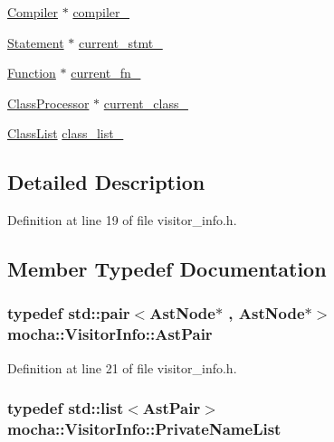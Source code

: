 \begin{DoxyCompactItemize}
\hyperlink{classmocha_1_1_compiler}{Compiler} $\ast$ \hyperlink{classmocha_1_1_visitor_info_a91d1119b49e7bd820bd36f6c7011acfe}{compiler\_\-}
\item 
\hyperlink{classmocha_1_1_statement}{Statement} $\ast$ \hyperlink{classmocha_1_1_visitor_info_a64433c4ddfa5d099664adcab8318d36d}{current\_\-stmt\_\-}
\item 
\hyperlink{classmocha_1_1_function}{Function} $\ast$ \hyperlink{classmocha_1_1_visitor_info_a61580002e89ad6a4365e058cd4ee4092}{current\_\-fn\_\-}
\item 
\hyperlink{classmocha_1_1_class_processor}{ClassProcessor} $\ast$ \hyperlink{classmocha_1_1_visitor_info_a2f5865d4e0ef494c7792ddb796bf3196}{current\_\-class\_\-}
\item 
\hyperlink{namespacemocha_a01ec919b1dd7cd6a9d355222341db47a}{ClassList} \hyperlink{classmocha_1_1_visitor_info_a257fe4a6379feb1392966b79e7a0399d}{class\_\-list\_\-}
\end{DoxyCompactItemize}


\subsection{Detailed Description}


Definition at line 19 of file visitor\_\-info.h.



\subsection{Member Typedef Documentation}
\hypertarget{classmocha_1_1_visitor_info_aca4b022d8c40ae27463f274064950f7e}{
\subsubsection[{AstPair}]{\setlength{\rightskip}{0pt plus 5cm}typedef std::pair$<${\bf AstNode}$\ast$ , {\bf AstNode}$\ast$$>$ {\bf mocha::VisitorInfo::AstPair}}}
\label{classmocha_1_1_visitor_info_aca4b022d8c40ae27463f274064950f7e}


Definition at line 21 of file visitor\_\-info.h.

\hypertarget{classmocha_1_1_visitor_info_a04e4999e36bdea0dd35e1b260181bfda}{
\subsubsection[{PrivateNameList}]{\setlength{\rightskip}{0pt plus 5cm}typedef std::list$<${\bf AstPair}$>$ {\bf mocha::VisitorInfo::PrivateNameList}}}
\label{classmocha_1_1_visitor_info_a04e4999e36bdea0dd35e1b260181bfda}


